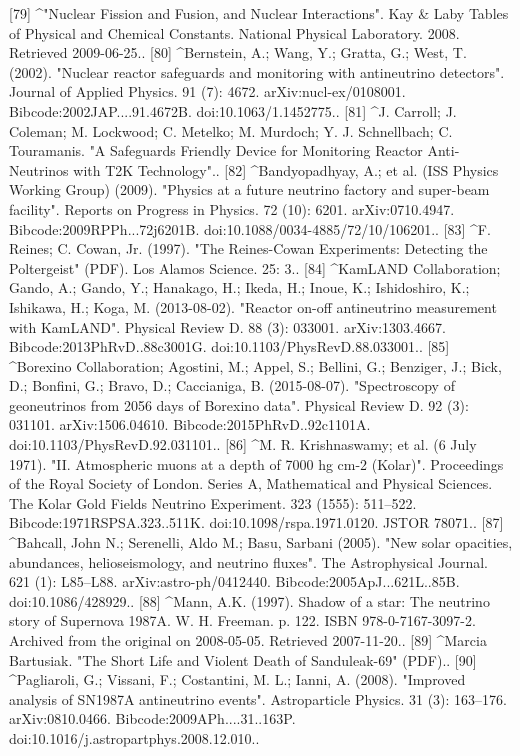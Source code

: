 [79]
^"Nuclear Fission and Fusion, and Nuclear Interactions". Kay & Laby Tables of Physical and Chemical Constants. National Physical Laboratory. 2008. Retrieved 2009-06-25..
[80]
^Bernstein, A.; Wang, Y.; Gratta, G.; West, T. (2002). "Nuclear reactor safeguards and monitoring with antineutrino detectors". Journal of Applied Physics. 91 (7): 4672. arXiv:nucl-ex/0108001. Bibcode:2002JAP....91.4672B. doi:10.1063/1.1452775..
[81]
^J. Carroll; J. Coleman; M. Lockwood; C. Metelko; M. Murdoch; Y. J. Schnellbach; C. Touramanis. "A Safeguards Friendly Device for Monitoring Reactor Anti-Neutrinos with T2K Technology"..
[82]
^Bandyopadhyay, A.; et al. (ISS Physics Working Group) (2009). "Physics at a future neutrino factory and super-beam facility". Reports on Progress in Physics. 72 (10): 6201. arXiv:0710.4947. Bibcode:2009RPPh...72j6201B. doi:10.1088/0034-4885/72/10/106201..
[83]
^F. Reines; C. Cowan, Jr. (1997). "The Reines-Cowan Experiments: Detecting the Poltergeist" (PDF). Los Alamos Science. 25: 3..
[84]
^KamLAND Collaboration; Gando, A.; Gando, Y.; Hanakago, H.; Ikeda, H.; Inoue, K.; Ishidoshiro, K.; Ishikawa, H.; Koga, M. (2013-08-02). "Reactor on-off antineutrino measurement with KamLAND". Physical Review D. 88 (3): 033001. arXiv:1303.4667. Bibcode:2013PhRvD..88c3001G. doi:10.1103/PhysRevD.88.033001..
[85]
^Borexino Collaboration; Agostini, M.; Appel, S.; Bellini, G.; Benziger, J.; Bick, D.; Bonfini, G.; Bravo, D.; Caccianiga, B. (2015-08-07). "Spectroscopy of geoneutrinos from 2056 days of Borexino data". Physical Review D. 92 (3): 031101. arXiv:1506.04610. Bibcode:2015PhRvD..92c1101A. doi:10.1103/PhysRevD.92.031101..
[86]
^M. R. Krishnaswamy; et al. (6 July 1971). "II. Atmospheric muons at a depth of 7000 hg cm-2 (Kolar)". Proceedings of the Royal Society of London. Series A, Mathematical and Physical Sciences. The Kolar Gold Fields Neutrino Experiment. 323 (1555): 511–522. Bibcode:1971RSPSA.323..511K. doi:10.1098/rspa.1971.0120. JSTOR 78071..
[87]
^Bahcall, John N.; Serenelli, Aldo M.; Basu, Sarbani (2005). "New solar opacities, abundances, helioseismology, and neutrino fluxes". The Astrophysical Journal. 621 (1): L85–L88. arXiv:astro-ph/0412440. Bibcode:2005ApJ...621L..85B. doi:10.1086/428929..
[88]
^Mann, A.K. (1997). Shadow of a star: The neutrino story of Supernova 1987A. W. H. Freeman. p. 122. ISBN 978-0-7167-3097-2. Archived from the original on 2008-05-05. Retrieved 2007-11-20..
[89]
^Marcia Bartusiak. "The Short Life and Violent Death of Sanduleak-69" (PDF)..
[90]
^Pagliaroli, G.; Vissani, F.; Costantini, M. L.; Ianni, A. (2008). "Improved analysis of SN1987A antineutrino events". Astroparticle Physics. 31 (3): 163–176. arXiv:0810.0466. Bibcode:2009APh....31..163P. doi:10.1016/j.astropartphys.2008.12.010..

